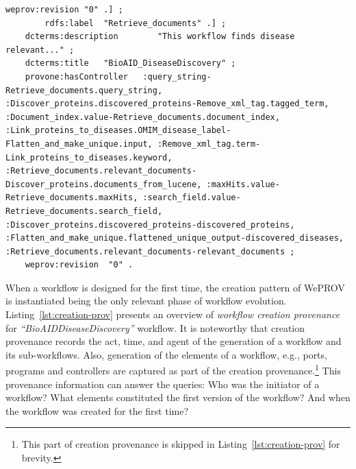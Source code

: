 \documentclass[ao]{iosart2x}
\begin{document}
\begin{lstlisting}[frame=single, caption={BioAIDDiseaseDiscovery workflow  specification provenance},label={lst:specs}]
            weprov:revision "0" .] ;
        rdfs:label  "Retrieve_documents" .] ;
    dcterms:description        "This workflow finds disease relevant..." ;
    dcterms:title 	"BioAID_DiseaseDiscovery" ;
    provone:hasController 	:query_string-Retrieve_documents.query_string, :Discover_proteins.discovered_proteins-Remove_xml_tag.tagged_term, :Document_index.value-Retrieve_documents.document_index, :Link_proteins_to_diseases.OMIM_disease_label-Flatten_and_make_unique.input, :Remove_xml_tag.term-Link_proteins_to_diseases.keyword, :Retrieve_documents.relevant_documents-Discover_proteins.documents_from_lucene, :maxHits.value-Retrieve_documents.maxHits, :search_field.value-Retrieve_documents.search_field, :Discover_proteins.discovered_proteins-discovered_proteins, :Flatten_and_make_unique.flattened_unique_output-discovered_diseases, :Retrieve_documents.relevant_documents-relevant_documents ;
    weprov:revision  "0" .
\end{lstlisting}

When a workflow is designed for the first time, the creation pattern of WePROV is instantiated being the only relevant phase of workflow evolution. 
Listing~\ref{lst:creation-prov} presents an overview of \textit{workflow creation provenance} for \textit{``BioAIDDiseaseDiscovery''} workflow. 
It is noteworthy that creation provenance records the act, time, and agent of the generation of a workflow and its sub-workflows. 
Also, generation of the elements of a workflow, e.g., ports, programs and controllers are captured as part of the creation provenance.\footnote{This part of creation provenance is skipped in Listing~\ref{lst:creation-prov} for brevity.}    
This provenance information can answer the queries: Who was the initiator of a workflow? What elements constituted the first version of the workflow? 
And when the workflow was created for the first time?  
\end{document}
